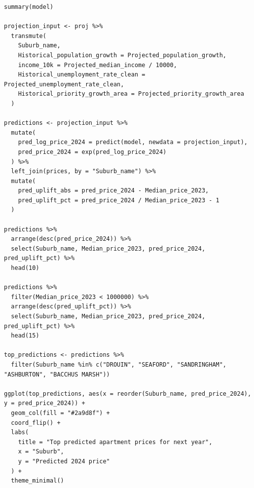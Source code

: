 \documentclass[11pt]{article}
\begin{document}
\begin{lstlisting}[style=rcode]
summary(model)

projection_input <- proj %>%
  transmute(
    Suburb_name,
    Historical_population_growth = Projected_population_growth,
    income_10k = Projected_median_income / 10000,
    Historical_unemployment_rate_clean = Projected_unemployment_rate_clean,
    Historical_priority_growth_area = Projected_priority_growth_area
  )

predictions <- projection_input %>%
  mutate(
    pred_log_price_2024 = predict(model, newdata = projection_input),
    pred_price_2024 = exp(pred_log_price_2024)
  ) %>%
  left_join(prices, by = "Suburb_name") %>%
  mutate(
    pred_uplift_abs = pred_price_2024 - Median_price_2023,
    pred_uplift_pct = pred_price_2024 / Median_price_2023 - 1
  )

predictions %>%
  arrange(desc(pred_price_2024)) %>%
  select(Suburb_name, Median_price_2023, pred_price_2024, pred_uplift_pct) %>%
  head(10)

predictions %>%
  filter(Median_price_2023 < 1000000) %>%
  arrange(desc(pred_uplift_pct)) %>%
  select(Suburb_name, Median_price_2023, pred_price_2024, pred_uplift_pct) %>%
  head(15)

top_predictions <- predictions %>%
  filter(Suburb_name %in% c("DROUIN", "SEAFORD", "SANDRINGHAM", "ASHBURTON", "BACCHUS MARSH"))

ggplot(top_predictions, aes(x = reorder(Suburb_name, pred_price_2024), y = pred_price_2024)) +
  geom_col(fill = "#2a9d8f") +
  coord_flip() +
  labs(
    title = "Top predicted apartment prices for next year",
    x = "Suburb",
    y = "Predicted 2024 price"
  ) +
  theme_minimal()

\end{lstlisting}
\end{document}

